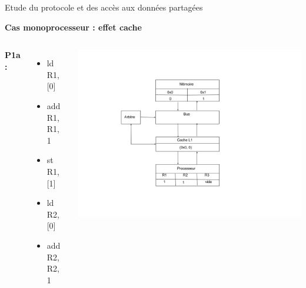 \documentclass{beamer}
\begin{document}
\begin{frame}{Etude du protocole et des accès aux données partagées}
    \addtocounter{framenumber}{-1}
    \textbf{Cas monoprocesseur : effet cache}
    \begin{columns}[c] %

        \textbf{P1a : }
        \begin{itemize}
            \item ld R1, [0]
            \item add R1, R1, 1
            \item  st R1, [1]
            \item  ld R2, [0]
            \item add R2, R2, 1
        \end{itemize}

        \includegraphics[scale=0.28]{f5.png}
        
    \end{columns}
\end{frame}
\end{document}
